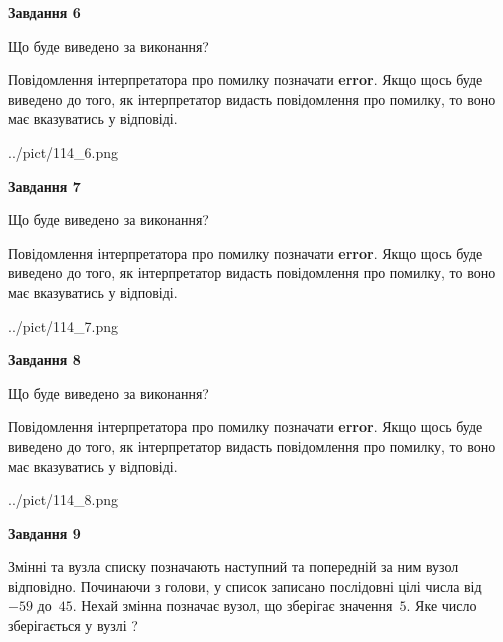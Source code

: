 \documentclass[12pt, ukrainian]{article}
\begin{document}
{\begin {large}
{\begin {center}\textbf{Завдання 6}\end {center}}\par
Що буде виведено за виконання?

Повідомлення інтерпретатора про помилку позначати \textbf{error}.
Якщо щось буде виведено до того, як інтерпретатор видасть повідомлення про помилку, 
то воно має вказуватись у відповіді. \par


\begin{center}
	{../pict/114_6.png}
\end{center}
\newpage

{\begin {center}\textbf{Завдання 7}\end {center}}\par
Що буде виведено за виконання?

Повідомлення інтерпретатора про помилку позначати \textbf{error}.
Якщо щось буде виведено до того, як інтерпретатор видасть повідомлення про помилку, 
то воно має вказуватись у відповіді. \par


\begin{center}
	{../pict/114_7.png}
\end{center}
\newpage

{\begin {center}\textbf{Завдання 8}\end {center}}\par
Що буде виведено за виконання?

Повідомлення інтерпретатора про помилку позначати \textbf{error}.
Якщо щось буде виведено до того, як інтерпретатор видасть повідомлення про помилку, 
то воно має вказуватись у відповіді. \par


\begin{center}
	{../pict/114_8.png}
\end{center}
\newpage

{\begin {center}\textbf{Завдання 9}\end {center}}\par
Змінні  та  вузла списку позначають наступний та попередній за ним вузол відповідно. Починаючи з голови, у список записано послідовні цілі числа від~$-59$ до~$45$. Нехай змінна  позначає вузол, що зберігає значення~$5$.
Яке число зберігається у вузлі  ?\par
\newpage


\end{large}}
\end{document}
